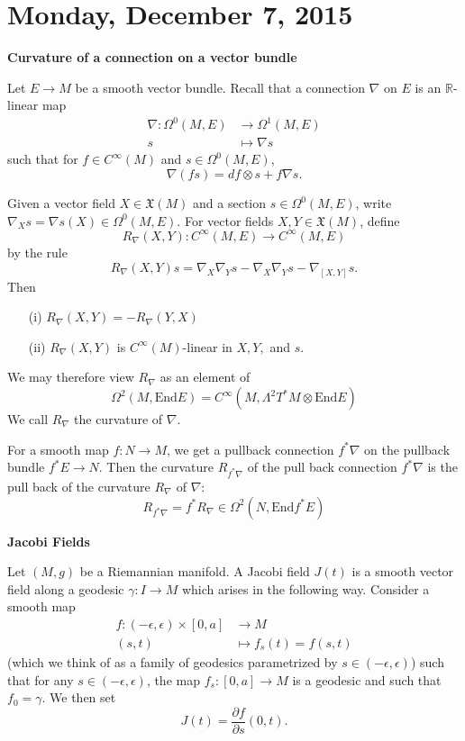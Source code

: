 \documentclass{amsart}
\numberwithin{equation}{section}
\newcommand{\bR}{\mathbb{R}}
\newcommand{\End}{\mathrm{End}}
\newcommand{\fX}{\mathfrak{X}}
\theoremstyle{definition}
\theoremstyle{theorem}
\begin{document}
\section{Monday, December 7, 2015} 


\noindent
{\bf \large Curvature of a connection on a vector bundle}

Let $E \to M$ be a smooth vector bundle. Recall that a connection $\nabla$ on $E$ is an $\bR$-linear map 
\begin{align*}
\nabla : \Omega^0(M,E) &\to \Omega^1(M,E) \\
s &\mapsto \nabla s
\end{align*}
such that for $f\in C^\infty(M)$ and $s\in \Omega^0(M,E)$,
$$
\nabla(fs)= df \otimes s + f\nabla s.
$$

Given a vector field $X\in \fX(M)$ and a section $s\in \Omega^0(M,E)$, write $\nabla_X s = \nabla s(X) \in \Omega^0(M,E)$.
For vector fields $X,Y \in \fX(M)$, define 
\[
R_\nabla(X,Y) : C^\infty(M,E) \to C^\infty(M,E)
\]
by the rule 
\[
R_\nabla(X,Y)s = \nabla_X \nabla_Y s  - \nabla_X \nabla_Y s - \nabla_{[X,Y]}s.
\]
Then 
\begin{enumerate}
\item[(i)] $R_\nabla(X,Y) = - R_{\nabla}(Y,X)$
\item[(ii)] $R_\nabla(X,Y)$ is $C^\infty(M)$-linear in $X,Y,$ and $s$. 
\end{enumerate}
We may therefore view $R_\nabla$ as an element of 
\[
 \Omega^2(M, \End E ) = C^\infty(M, \Lambda^2 T^*M \otimes \End E) 
\]
We call $R_\nabla$ the curvature of $\nabla$. 


For a smooth map $f : N \to M$, we get a pullback connection $f^* \nabla$  on the pullback bundle $f^*E \to N$. Then the curvature
$R_{f^*\nabla}$ of the pull back connection $f^*\nabla$ is the pull back of the curvature $R_\nabla$ of $\nabla$: 
\[
R_{f^*\nabla} = f^*R_\nabla \in \Omega^2(N, \text{End} f^*E)
\]


\bigskip

\noindent
{\bf \large Jacobi Fields}

Let $(M,g)$ be a Riemannian manifold. A Jacobi field $J(t)$ is a smooth vector field along a 
geodesic $\gamma : I \to M$ which arises in the following way. Consider a smooth map
\begin{align*}
f : (-\epsilon, \epsilon) \times [0,a] &\to M \\
(s,t) &\mapsto f_s(t) = f(s,t)
\end{align*}
(which we think of as a family of geodesics parametrized by $s \in (-\epsilon, \epsilon)$) such that for any $s \in (-\epsilon, \epsilon)$, the map $f_s : [0,a] \to M$ is a geodesic and such that $f_0 = \gamma$. We then set 
\[
J(t) = \frac{\partial f}{\partial s}(0,t). 
\]
\end{document}
